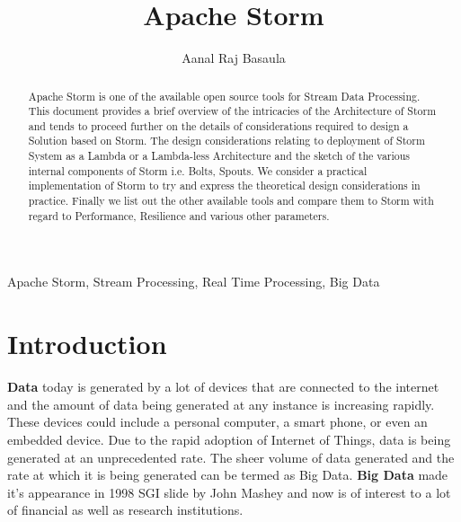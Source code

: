 \documentclass[runningheads,a4paper]{llncs}[2015/06/24]
\begin{document}
\title{Apache Storm}

\author{Aanal Raj Basaula}






\frontpageen %

\thispagestyle{empty}
\cleardoublepage

\maketitle

\begin{abstract}
Apache Storm is one of the available open source tools for Stream Data Processing. This document provides a brief overview of the intricacies of the Architecture of Storm and tends to proceed further on the details of considerations required to design a Solution based on Storm. The design considerations relating to deployment of Storm System as a Lambda or a Lambda-less Architecture and the sketch of the various internal components of Storm i.e. Bolts, Spouts. We consider a practical implementation of Storm to try and express the theoretical design considerations in practice. Finally we list out the other available tools and compare them to Storm with regard to Performance, Resilience and various other parameters.
\end{abstract}

\begin{keywords}
Apache Storm, Stream Processing, Real Time Processing, Big Data
\end{keywords}

\section{Introduction}

\textbf{Data} today is generated by a lot of devices that are connected to the internet and the amount of data being generated at any instance is increasing rapidly. These devices could include a personal computer, a smart phone, or even an embedded device. Due to the rapid adoption of Internet of Things, data is being generated at an unprecedented rate. The sheer volume of data generated and the rate at which it is being generated can be termed as Big Data. \textbf{Big Data} made it's appearance in 1998 SGI slide by John Mashey and now is of interest to a lot of financial as well as research institutions.\cite{miningstatus}
\end{document}
